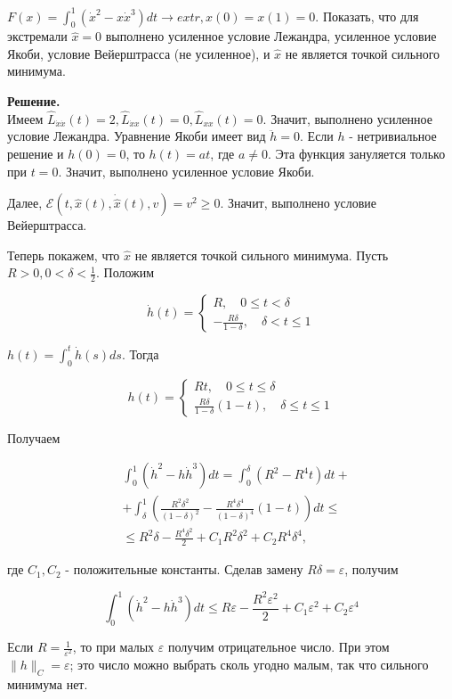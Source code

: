 \begin{task}

$F(x)=\int_0^1\left(\dot{x}^2-x \dot{x}^3\right) d t \rightarrow extr , x(0)=x(1)=0$. Показать, что для экстремали $\hat x = 0$ выполнено усиленное условие Лежандра, 
усиленное условие Якоби, условие Вейерштрасса (не усиленное), и $\hat x$ не является точкой сильного минимума. 

\textbf{Решение.} \\   
Имеем $\hat{L}_{\dot{x} \dot{x}}(t)=2, \hat{L}_{\dot{x} x}(t)=0, \hat{L}_{x x}(t)=0$. Значит, выполнено усиленное условие Лежандра. Уравнение Якоби имеет вид $\ddot{h}=0$. Если $h$ - нетривиальное решение и $h(0)=0$, то $h(t)=a t$, где $a \neq 0$. Эта функция зануляется только при $t=0$. Значит, выполнено усиленное условие Якоби.

Далее, $\mathcal{E}(t, \hat{x}(t), \dot{\hat{x}}(t), v)=v^{2} \geq 0$. Значит, выполнено условие Вейерштрасса.

Теперь покажем, что $\hat{x}$ не является точкой сильного минимума. Пусть $R>0,0<\delta<\frac{1}{2}$. Положим

$$
\dot{h}(t)=\left\{\begin{array}{l}
R, \quad 0 \leq t<\delta \\
-\frac{R \delta}{1-\delta}, \quad \delta<t \leq 1
\end{array}\right.
$$

$h(t)=\int_{0}^{t} \dot{h}(s) d s$. Тогда

$$
h(t)=\left\{\begin{array}{l}
R t, \quad 0 \leq t \leq \delta \\
\frac{R \delta}{1-\delta}(1-t), \quad \delta \leq t \leq 1
\end{array}\right.
$$

Получаем

$$
\begin{aligned}
& \int_{0}^{1}\left(\dot{h}^{2}-h \dot{h}^{3}\right) d t=\int_{0}^{\delta}\left(R^{2}-R^{4} t\right) d t+ \\
& +\int_{\delta}^{1}\left(\frac{R^{2} \delta^{2}}{(1-\delta)^{2}}-\frac{R^{4} \delta^{4}}{(1-\delta)^{4}}(1-t)\right) d t \leq \\
& \leq R^{2} \delta-\frac{R^{4} \delta^{2}}{2}+C_{1} R^{2} \delta^{2}+C_{2} R^{4} \delta^{4},
\end{aligned}
$$

где $C_{1}, C_{2}$ - положительные константы. Сделав замену $R \delta=\varepsilon$, получим

$$
\int_{0}^{1}\left(\dot{h}^{2}-h \dot{h}^{3}\right) d t \leq R \varepsilon-\frac{R^{2} \varepsilon^{2}}{2}+C_{1} \varepsilon^{2}+C_{2} \varepsilon^{4}
$$

Если $R=\frac{1}{\varepsilon^{2}}$, то при малых $\varepsilon$ получим отрицательное число. При этом $\|h\|_{C}=\varepsilon$; это число можно выбрать сколь угодно малым, так что сильного минимума нет.


\end{task}